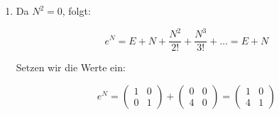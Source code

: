 \begin{enumerate}
	\item Da $N^2 = 0$, folgt:

	      \[
		      e^N = E + N + \frac{N^2}{2!} + \frac{N^3}{3!} + \ldots = E + N
	      \]

	      Setzen wir die Werte ein:

	      \[
		      e^N = \begin{pmatrix} 1 & 0 \\ 0 & 1 \end{pmatrix} + \begin{pmatrix} 0 & 0 \\ 4 & 0 \end{pmatrix} = \begin{pmatrix} 1 & 0 \\ 4 & 1 \end{pmatrix}
	      \]


\end{enumerate}
